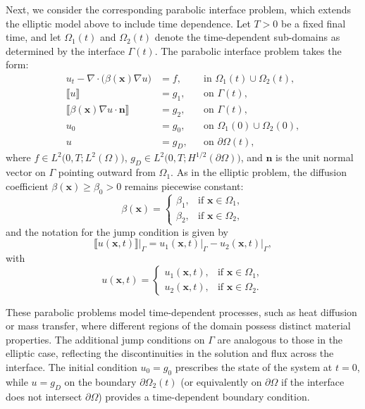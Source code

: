 \documentclass{article}
\begin{document}
\medskip
Next, we consider the corresponding parabolic interface problem, which extends the elliptic model above to include time dependence. Let $T>0$ be a fixed final time, and let $\Omega_1(t)$ and $\Omega_2(t)$ denote the time-dependent sub-domains as determined by the interface $\Gamma(t)$. The parabolic interface problem takes the form:
\begin{equation}\label{modelpextenddnnpaowu}
\begin{aligned}
u_t - \nabla \cdot \bigl(\beta(\boldsymbol{x}) \nabla u\bigr) & = f, & & \text{in } \Omega_1(t) \cup \Omega_2(t), \\
\llbracket u \rrbracket & = g_1, & & \text{on } \Gamma(t), \\
\llbracket \beta(\boldsymbol{x}) \nabla u \cdot \boldsymbol{n} \rrbracket & = g_2, & & \text{on } \Gamma(t), \\
u_0 & = g_0, & & \text{on } \Omega_1(0) \cup \Omega_2(0),\\
u & = g_D, & & \text{on } \partial \Omega(t),
\end{aligned}
\end{equation}
where $f \in L^2\bigl(0,T; L^2(\Omega)\bigr)$, $g_D \in L^2\bigl(0,T; H^{1/2}(\partial \Omega)\bigr)$, and $\boldsymbol{n}$ is the unit normal vector on $\Gamma$ pointing outward from $\Omega_1$. As in the elliptic problem, the diffusion coefficient $\beta(\boldsymbol{x}) \ge \beta_0 > 0$ remains piecewise constant:
\[
\beta(\boldsymbol{x}) = 
\begin{cases}
\beta_1, & \text{if } \boldsymbol{x} \in \Omega_1,\\
\beta_2, & \text{if } \boldsymbol{x} \in \Omega_2,
\end{cases}
\]
and the notation for the jump condition is given by
\[
\left.\llbracket u(\boldsymbol{x}, t) \rrbracket\right|_{\Gamma}
= \left.u_1(\boldsymbol{x}, t)\right|_{\Gamma} - \left.u_2(\boldsymbol{x}, t)\right|_{\Gamma},
\]
with
\[
u(\boldsymbol{x}, t)=
\begin{cases}
u_1(\boldsymbol{x}, t), & \text{if } \boldsymbol{x} \in \Omega_1,\\
u_2(\boldsymbol{x}, t), & \text{if } \boldsymbol{x} \in \Omega_2.
\end{cases}
\]

These parabolic problems model time-dependent processes, such as heat diffusion or mass transfer, where different regions of the domain possess distinct material properties. The additional jump conditions on $\Gamma$ are analogous to those in the elliptic case, reflecting the discontinuities in the solution and flux across the interface. The initial condition $u_0 = g_0$ prescribes the state of the system at $t = 0$, while $u = g_D$ on the boundary $\partial \Omega_2(t)$ (or equivalently on $\partial \Omega$ if the interface does not intersect $\partial \Omega$) provides a time-dependent boundary condition. 
\end{document}
